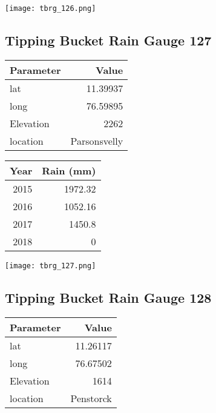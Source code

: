 \documentclass[a4paper]{article}
\begin{document}
\begin{center}
\texttt{[image: tbrg\_126.png]}
\end{center}

\newpage

\subsection*{Tipping Bucket Rain Gauge 127}
\label{sec:org3468fe3}

\begin{center}
\begin{tabular}{lr}
Parameter & Value\\
\hline
lat & 11.39937\\
long & 76.59895\\
Elevation & 2262\\
location & Parsonsvelly\\
\end{tabular}
\end{center}

\begin{center}
\begin{tabular}{rr}
Year & Rain (mm)\\
\hline
2015 & 1972.32\\
2016 & 1052.16\\
2017 & 1450.8\\
2018 & 0\\
\end{tabular}
\end{center}

\begin{center}
\texttt{[image: tbrg\_127.png]}
\end{center}

\newpage

\subsection*{Tipping Bucket Rain Gauge 128}
\label{sec:org8c56742}

\begin{center}
\begin{tabular}{lr}
Parameter & Value\\
\hline
lat & 11.26117\\
long & 76.67502\\
Elevation & 1614\\
location & Penstorck\\
\end{tabular}
\end{center}
\end{document}
